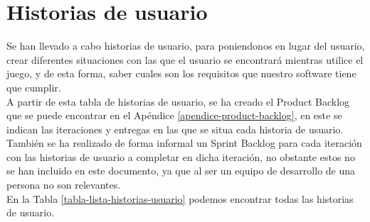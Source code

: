 
\section{Historias de usuario}
Se han llevado a cabo historias de usuario, para poniendonos en lugar del usuario, crear diferentes situaciones con las que el usuario se encontrará mientras utilice el juego, y de esta forma, saber cuales son los requisitos que nuestro software tiene que cumplir.\\

A partir de esta tabla de historias de usuario, se ha creado el Product Backlog que se puede encontrar en el Apéndice \ref{apendice-product-backlog}, en este se indican las iteraciones y entregas en las que se situa cada historia de usuario.\\

También se ha realizado de forma informal un Sprint Backlog para cada iteración con las historias de usuario a completar en dicha iteración, no obstante estos no se han incluido en este documento, ya que al ser un equipo de desarrollo de una persona no son relevantes.\\

En la Tabla \ref{tabla-lista-historias-usuario} podemos encontrar todas las historias de usuario.


